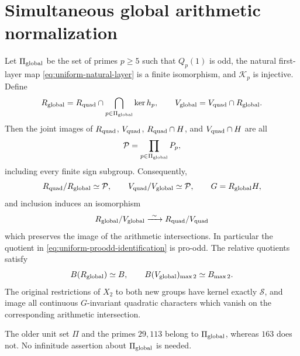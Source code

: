 \section{Simultaneous global arithmetic normalization}
\label{sec:simultaneous-global-cm}

\begin{theorem}
\label{thm:simultaneous-global-cm-normalization}
Let \(\Pi_{\rm global}\) be the set of primes \(p\geq5\) such that
\(Q_p(1)\) is odd, the natural first-layer map
\eqref{eq:uniform-natural-layer} is a finite isomorphism, and
\(\mathscr K_p\) is injective. Define
\[
 R_{\rm global}=R_{\rm quad}\cap
       \bigcap_{p\in\Pi_{\rm global}}\ker h_p,\qquad
 V_{\rm global}=V_{\rm quad}\cap R_{\rm global}.
\]
Then the joint images of \(R_{\rm quad}\), \(V_{\rm quad}\),
\(R_{\rm quad}\cap H\), and \(V_{\rm quad}\cap H\) are all
\[
 \mathcal P=\prod_{p\in\Pi_{\rm global}}P_p,
\]
including every finite sign subgroup. Consequently,
\begin{equation}
 R_{\rm quad}/R_{\rm global}\simeq\mathcal P,\qquad
 V_{\rm quad}/V_{\rm global}\simeq\mathcal P,\qquad
 G=R_{\rm global}H,
 \label{eq:uniform-global-factorization}
\end{equation}
and inclusion induces an isomorphism
\begin{equation}
 R_{\rm global}/V_{\rm global}
       \xrightarrow{\ \sim\ }R_{\rm quad}/V_{\rm quad}
 \label{eq:uniform-proodd-identification}
\end{equation}
which preserves the image of the arithmetic intersections.
In particular the quotient in \eqref{eq:uniform-proodd-identification}
is pro-odd. The relative quotients satisfy
\begin{equation}
 B(R_{\rm global})\simeq B,\qquad
 B(V_{\rm global})_{\max2}\simeq B_{\max2}.
 \label{eq:uniform-relative-quotients}
\end{equation}
The original restrictions of \(X_2\) to both new groups have
kernel exactly \(\mathcal S\), and image all continuous
\(G\)-invariant quadratic characters which vanish on the
corresponding arithmetic intersection.

The older unit set \(\Pi\) and the primes \(29,113\) belong to
\(\Pi_{\rm global}\), whereas \(163\) does not. No infinitude
assertion about \(\Pi_{\rm global}\) is needed.
\end{theorem}
